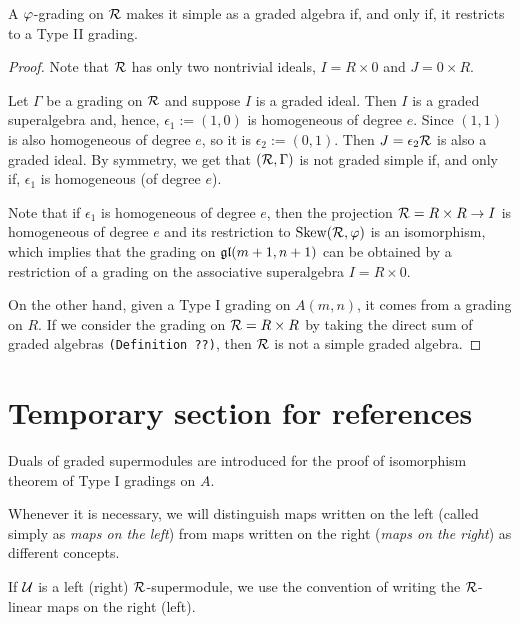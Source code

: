 \documentclass{amsbook}
\begin{document}
\begin{prop}\label{prop:typeII-iff-RxR-simple}
    A $\varphi$-grading on $\mathcal R$ makes it simple as a graded algebra if, and only if, it restricts to a Type II grading.
\end{prop}

\begin{proof}
    Note that $\mathcal R$ has only two nontrivial ideals, $I = R\times 0$ and $J = 0\times R$.
    
    Let $\Gamma$ be a grading on $\mathcal R$ and suppose $I$ is a graded ideal. Then $I$ is a graded superalgebra and, hence, $\epsilon_1 := (1,0)$ is homogeneous of degree $e$. Since $(1,1)$ is also homogeneous of degree $e$, so it is $\epsilon_2:= (0,1)$. Then $J = \epsilon_2 \mathcal R$ is also a graded ideal. By symmetry, we get that $(\mathcal R, \Gamma)$ is not graded simple if, and only if, $\epsilon_1$ is homogeneous (of degree $e$).
    
    Note that if $\epsilon_1$ is homogeneous of degree $e$, then the projection $\mathcal R = R\times R \to I$ is homogeneous of degree $e$ and its restriction to $\operatorname{Skew}(\mathcal R, \varphi)$ is an isomorphism, which implies that the grading on $\mathfrak{gl}(m +1, n+1)$ can be obtained by a restriction of a grading on the associative superalgebra $I = R\times 0$.
    
    On the other hand, given a Type I grading on $A(m,n)$, it comes from a grading on $R$. If we consider the grading on $\mathcal R = R\times R$ by taking the direct sum of graded algebras {\tt (Definition ??)}, then $\mathcal R$ is not a simple graded algebra.
\end{proof}

\section{Temporary section for references}

Duals of graded supermodules are introduced for the proof of isomorphism theorem of Type I gradings on $A$.

\begin{convention}\label{conv:maps-left-right}
    Whenever it is necessary, we will distinguish maps written on the left (called simply as \emph{maps on the left}) from maps written on the  right (\emph{maps on the right}) as different concepts.
    
    If $\mathcal U$ is a left (right) $\mathcal R$-supermodule, we use the convention of writing the $\mathcal R$-linear maps on the right (left).
\end{convention}
\end{document}
